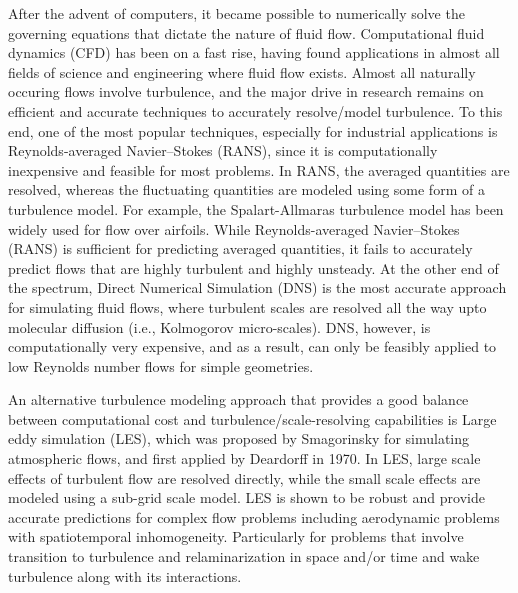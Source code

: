 After the advent of computers, it became possible to numerically solve the governing equations that dictate the nature of fluid flow.
Computational fluid dynamics (CFD) has been on a fast rise, having found applications in almost all fields of science and engineering where fluid flow exists.
Almost all naturally occuring flows involve turbulence, and the major drive in research remains on efficient and accurate techniques to accurately resolve/model turbulence.
To this end, one of the most popular techniques, especially for industrial applications is Reynolds-averaged Navier–Stokes (RANS), since it is computationally inexpensive and feasible for most problems.
In RANS, the averaged quantities are resolved, whereas the fluctuating quantities are modeled using some form of a turbulence model. For example, the Spalart-Allmaras turbulence model \cite{bib:Spalart} has been widely used for flow over airfoils.
While Reynolds-averaged Navier–Stokes (RANS) is sufficient for predicting averaged quantities, it fails to accurately predict flows that are highly turbulent and highly unsteady.
At the other end of the spectrum, Direct Numerical Simulation (DNS) is the most accurate approach for simulating fluid flows, where turbulent scales are resolved all the way upto molecular diffusion (i.e., Kolmogorov micro-scales).
DNS, however, is computationally very expensive, and as a result, can only be feasibly applied to low Reynolds number flows for simple geometries.

An alternative turbulence modeling approach that provides a good balance between computational cost and turbulence/scale-resolving capabilities is Large eddy simulation (LES), which was proposed by Smagorinsky \cite{bib:smag} for simulating atmospheric flows, and first applied by Deardorff \cite{bib:deardorff1970} in 1970.
In LES, large scale effects of turbulent flow are resolved directly, while the small scale effects are modeled using a sub-grid scale model.
LES is shown to be robust and provide accurate predictions for complex flow problems including aerodynamic problems with spatiotemporal inhomogeneity. Particularly for problems that involve transition to turbulence and relaminarization in space and/or time and wake turbulence along with its interactions.



